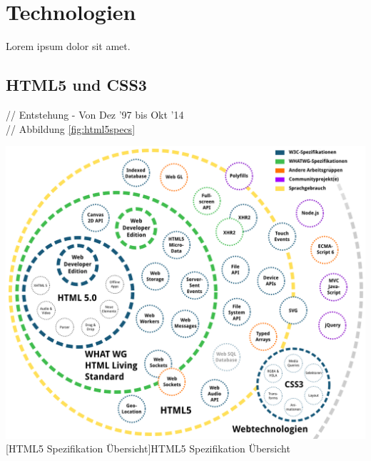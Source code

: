 \documentclass[12pt,a4paper,bibliography=totocnumbered,listof=totocnumbered]{scrartcl}
\begin{document}
\pagebreak
\section{Technologien}
Lorem ipsum dolor sit amet.
%

\subsection{HTML5 und CSS3}
// Entstehung - Von Dez '97 bis Okt '14\\
// Abbildung \ref{fig:html5specs}\\
	\vspace{1em}
	\begin{minipage}{\linewidth}
		\centering
		\includegraphics[width=1\linewidth]{images/html5_specs.png}
		[HTML5 Spezifikation Übersicht]{HTML5 Spezifikation Übersicht\footnotemark }
		\label{fig:html5specs}
	\end{minipage}
	
\end{document}
